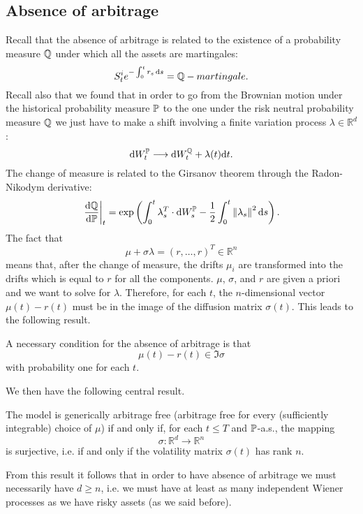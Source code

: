 \subsection{Absence of arbitrage}
Recall that the absence of arbitrage is related to the existence of a probability measure $\mathbb{Q}$ under which all the assets are martingales:
\begin{equation*}
    S^i_t e^{-\int_0^t r_s\,\dd s} = \mathbb{Q}-martingale.
\end{equation*}
Recall also that we found that in order to go from the Brownian motion under the historical probability measure $\mathbb{P}$ to the one under the risk neutral probability measure $\mathbb{Q}$ we just have to make a shift involving a finite variation process $\lambda\in\mathbb{R}^d$:
\begin{equation*}
    \dd W_t^{\mathbb{P}} \longrightarrow \dd W_t^{\mathbb{Q}} + \lambda(t)\dd t.
\end{equation*}
The change of measure is related to the Girsanov theorem through the Radon-Nikodym derivative:
\begin{equation}
    \eval{\dv{\mathbb{Q}}{\mathbb{P}}}_t = \exp\left(\int^t_0 \lambda_s^T\cdot\dd W_s^{\mathbb{P}}-\dfrac{1}{2}\int^t_0 \norm{\lambda_s}^2\,\dd s\right).
\end{equation}
The fact that
\begin{equation}\label{159}
    \mu + \sigma\lambda = (r,\dots,r)^T \in \mathbb{R}^n
\end{equation}
means that, after the change of measure, the drifts $\mu_i$ are transformed into the drifts which is equal to $r$ for all the components. $\mu$, $\sigma$, and $r$ are given a priori and we want to solve for $\lambda$. Therefore, for each $t$, the $n$-dimensional vector $\mu(t)-r(t)$ must be in the image of the diffusion matrix $\sigma(t)$. This leads to the following result.
\begin{proposition}
    A necessary condition for the absence of arbitrage is that
    \begin{equation}
        \mu(t) - r(t) \in \Im{\sigma}
    \end{equation}
    with probability one for each $t$.
\end{proposition}
We then have the following central result.
\begin{proposition}
    The model is generically arbitrage free (arbitrage free for every (sufficiently integrable) choice of $\mu$) if and only if, for each $t\le T$ and $\mathbb{P}$-a.s., the mapping
    \begin{equation}
        \sigma: \mathbb{R}^d \to \mathbb{R}^n
    \end{equation}
    is surjective, i.e. if and only if the volatility matrix $\sigma(t)$ has rank $n$.
\end{proposition}
From this result it follows that in order to have absence of arbitrage we must necessarily have $d\ge n$, i.e. we must have at least as many independent Wiener processes as we have risky assets (as we said before).


